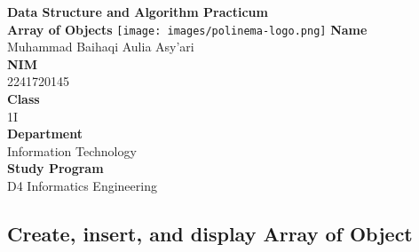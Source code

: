 \documentclass[12pt,titlepage]{article}
\newcommand{\vSubject}{Data Structure and Algorithm Practicum}
\newcommand{\vSubtitle}{Array of Objects}
\newcommand{\vName}{Muhammad Baihaqi Aulia Asy'ari}
\newcommand{\vNIM}{2241720145}
\newcommand{\vClass}{1I}
\newcommand{\vDepartment}{Information Technology}
\newcommand{\vStudyProgram}{D4 Informatics Engineering}
\begin{document}
\begin{titlepage}
    \centering
    \vfill
    {\bfseries\LARGE
        \vSubject\\
        \vskip0.25cm
        \vSubtitle
    }
    \vfill
    \texttt{[image: images/polinema-logo.png]}
    \vfill
    {
        \textbf{Name}\\
        \vName\\
        \vskip0.5cm
        \textbf{NIM}\\
        \vNIM\\
        \vskip0.5cm
        \textbf{Class}\\
        \vClass\\
        \vskip0.5cm
        \textbf{Department}\\
        \vDepartment\\
        \vskip0.5cm
        \textbf{Study Program}\\
        \vStudyProgram
    }
\end{titlepage}

\newpage

\setcounter{section}{1}
\setcounter{subsection}{1}
\subsection{Create, insert, and display Array of Object}
\end{document}
